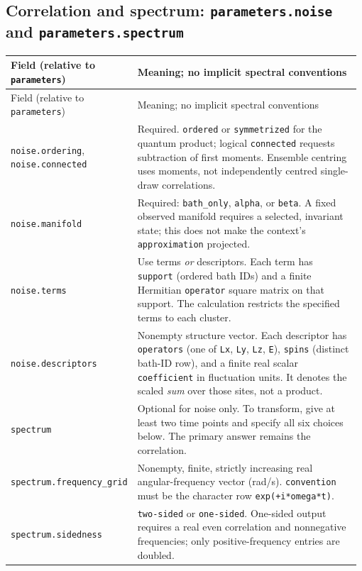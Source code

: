 \documentclass[11pt,a4paper]{article}
\newcommand{\code}[1]{\texttt{#1}}
\begin{document}
\subsection{Correlation and spectrum: \code{parameters.noise} and \code{parameters.spectrum}}
\begingroup\small
\begin{longtable}{@{}>{\raggedright\arraybackslash}p{0.335\linewidth}@{\hspace{0.025\linewidth}}>{\raggedright\arraybackslash}p{0.64\linewidth}@{}}
\toprule
Field (relative to \code{parameters}) & Meaning; no implicit spectral conventions\\
\midrule\endfirsthead
\toprule
Field (relative to \code{parameters}) & Meaning; no implicit spectral conventions\\
\midrule\endhead
\midrule\endfoot
\bottomrule\endlastfoot
\code{noise.ordering}, \code{noise.connected} & Required. \code{ordered} or \code{symmetrized} for the quantum product; logical \code{connected} requests subtraction of first moments. Ensemble centring uses moments, not independently centred single-draw correlations.\\
\code{noise.manifold} & Required: \code{bath\_only}, \code{alpha}, or \code{beta}. A fixed observed manifold requires a selected, invariant state; this does not make the context's \code{approximation} projected.\\
\code{noise.terms} & Use terms \emph{or} descriptors. Each term has \code{support} (ordered bath IDs) and a finite Hermitian \code{operator} square matrix on that support. The calculation restricts the specified terms to each cluster.\\
\code{noise.descriptors} & Nonempty structure vector. Each descriptor has \code{operators} (one of \code{Lx}, \code{Ly}, \code{Lz}, \code{E}), \code{spins} (distinct bath-ID row), and a finite real scalar \code{coefficient} in fluctuation units. It denotes the scaled \emph{sum} over those sites, not a product.\\
\code{spectrum} & Optional for noise only. To transform, give at least two time points and specify all six choices below. The primary answer remains the correlation.\\
\code{spectrum.frequency\_grid} & Nonempty, finite, strictly increasing real angular-frequency vector (rad/s). \code{convention} must be the character row \code{exp(+i*omega*t)}.\\
\code{spectrum.sidedness} & \code{two-sided} or \code{one-sided}. One-sided output requires a real even correlation and nonnegative frequencies; only positive-frequency entries are doubled.\\

\end{longtable}
\end{document}
